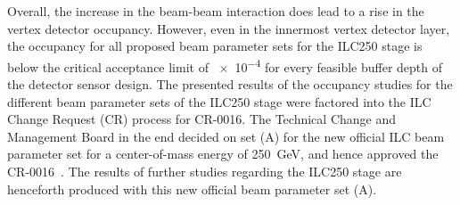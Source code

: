 Overall, the increase in the beam-beam interaction does lead to a rise in the \sid vertex detector occupancy.
However, even in the innermost vertex detector layer, the occupancy for all proposed beam parameter sets for the ILC250 stage is below the critical acceptance limit of \num{e-4} for every feasible buffer depth of the detector sensor design.
The presented results of the \sid occupancy studies for the different beam parameter sets of the ILC250 stage were factored into the ILC Change Request (CR) process for CR-0016.
The Technical Change and Management Board in the end decided on set (A) for the new official ILC beam parameter set for a center-of-mass energy of \SI{250}{\GeV}, and hence approved the CR-0016~\cite{LCWS17_TCMBmeeting,CR-0016}.
The results of further studies regarding the ILC250 stage are henceforth produced with this new official beam parameter set (A).

